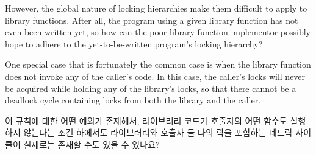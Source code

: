 However, the global nature of locking hierarchies make them difficult to
apply to library functions.
After all, the program using a given library function has not even been
written yet, so how can the poor library-function implementor possibly
hope to adhere to the yet-to-be-written program's locking hierarchy?

One special case that is fortunately the common case is when
the library function does not invoke any of the caller's code.
In this case, the caller's locks will never be acquired while holding
any of the library's locks, so that there cannot be a deadlock cycle
containing locks from both the library and the caller.
\fi

\QuickQuiz{}
	이 규칙에 대한 어떤 예외가 존재해서, 라이브러리 코드가 호출자의 어떤
	함수도 실행하지 않는다는 조건 하에서도 라이브러리와 호출자 둘 다의 락을
	포함하는 데드락 사이클이 실제로는 존재할 수도 있을 수 있나요?
	\iffalse

